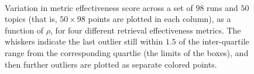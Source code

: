 \begin{figure}[t!]
\centering
{}
\\
\caption{Variation in metric effectiveness score across a set of $98$
runs and $50$ topics (that is, $50 \times 98$ points are plotted in
each column), as a function of $\rho$, for four different retrieval
effectiveness metrics.
The whiskers indicate the last outlier still within $1.5$ of the
inter-quartile range from the corresponding quartlie (the limits of
the boxes), and then further outliers are plotted as separate colored
points.
\label{fig-score-variation}}
\end{figure}

